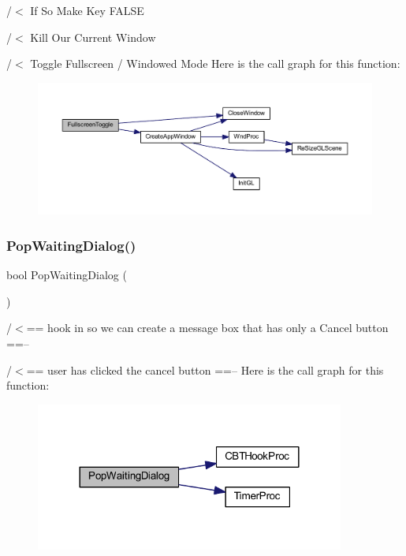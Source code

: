 /$<$ If So Make Key F\+A\+L\+SE

/$<$ Kill Our Current Window

/$<$ Toggle Fullscreen / Windowed Mode Here is the call graph for this function\+:\nopagebreak
\begin{figure}[H]
\begin{center}
\leavevmode
\includegraphics[width=350pt]{supportcode_8h_a79e747d7a0c4b5bad264e5a27c00baa5_cgraph}
\end{center}
\end{figure}
\mbox{\label{supportcode_8h_a23a9dac9e61c325f69b12b1b92b7d1f9}} 
\subsubsection{Pop\+Waiting\+Dialog()}
{\footnotesize\ttfamily bool Pop\+Waiting\+Dialog (\begin{DoxyParamCaption}{ }\end{DoxyParamCaption})}

/$<$== hook in so we can create a message box that has only a \textquotesingle{}Cancel\textquotesingle{} button ==--

/$<$== user has clicked the cancel button ==-- Here is the call graph for this function\+:\nopagebreak
\begin{figure}[H]
\begin{center}
\leavevmode
\includegraphics[width=288pt]{supportcode_8h_a23a9dac9e61c325f69b12b1b92b7d1f9_cgraph}
\end{center}
\end{figure}
\mbox{\label{supportcode_8h_aeeb837f0142eef8fa30508b562b8789b}} 
